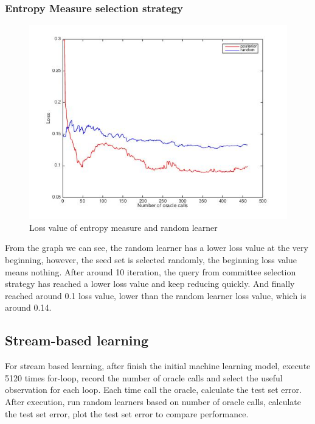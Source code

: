 \documentclass{article}
\begin{document}
\subsubsection{Entropy Measure selection strategy}
\begin{figure}[H]
\centering
\includegraphics[scale=0.5]{posterior_vs_random_pool_based}
\caption{Loss value of entropy measure and random learner}
\end{figure}
From the graph we can see, the random learner has a lower loss value at the very beginning, however, the seed set is selected randomly, the beginning loss value means nothing. After around 10 iteration, the query from committee selection strategy has reached a lower loss value and keep reducing quickly. And finally reached around 0.1 loss value, lower than the random learner loss value, which is around 0.14.
\subsection{Stream-based learning}
For stream based learning, after finish the initial machine learning model, execute 5120 times for-loop, record the number of oracle calls and select the useful observation for each loop. Each time call the oracle, calculate the test set error. After execution, run random learners based on number of oracle calls, calculate the test set error, plot the test set error to compare performance.
\end{document}
